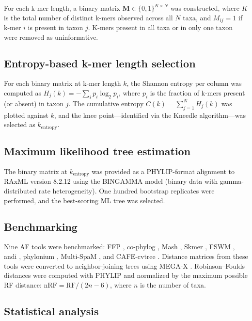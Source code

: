 \documentclass[11pt]{article}
\begin{document}
For each k-mer length, a binary matrix $\mathbf{M} \in \{0,1\}^{K \times N}$ was constructed, where $K$ is the total number of distinct k-mers observed across all $N$ taxa, and $M_{ij} = 1$ if k-mer $i$ is present in taxon $j$. K-mers present in all taxa or in only one taxon were removed as uninformative.

\subsection{Entropy-based k-mer length selection}

For each binary matrix at k-mer length $k$, the Shannon entropy per column was computed as $H_j(k) = -\sum_{i} p_i \log_2 p_i$, where $p_i$ is the fraction of k-mers present (or absent) in taxon $j$. The cumulative entropy $C(k) = \sum_{j=1}^{N} H_j(k)$ was plotted against $k$, and the knee point---identified via the Kneedle algorithm---was selected as $k_{\text{entropy}}$.

\subsection{Maximum likelihood tree estimation}

The binary matrix at $k_{\text{entropy}}$ was provided as a PHYLIP-format alignment to RAxML version 8.2.12 \citep{stamatakis2014} using the BINGAMMA model (binary data with gamma-distributed rate heterogeneity). One hundred bootstrap replicates were performed, and the best-scoring ML tree was selected.

\subsection{Benchmarking}

Nine AF tools were benchmarked: FFP \citep{sims2009}, co-phylog \citep{yi2013}, Mash \citep{ondov2016}, Skmer \citep{sarmashghi2019}, FSWM \citep{leimeister2017}, andi \citep{haubold2015}, phylonium \citep{kloetzl2020}, Multi-SpaM \citep{dencker2020}, and CAFE-cvtree \citep{lu2017}. Distance matrices from these tools were converted to neighbor-joining trees using MEGA-X \citep{kumar2018}. Robinson--Foulds distances were computed with PHYLIP \citep{felsenstein2005} and normalized by the maximum possible RF distance: $\text{nRF} = \text{RF} / (2n - 6)$, where $n$ is the number of taxa.

\subsection{Statistical analysis}
\end{document}
